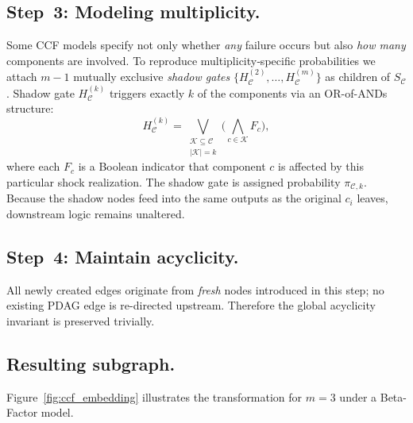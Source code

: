 \subsection{Step~3: Modeling multiplicity.}  Some CCF models specify not only
whether \emph{any} failure occurs but also \emph{how many} components are
involved.  To reproduce multiplicity‐specific probabilities we attach
\(m-1\) mutually exclusive \textit{shadow gates}
\(\{ H^{(2)}_{\mathcal{C}},\dots,H^{(m)}_{\mathcal{C}} \}\) as children of
\(S_{\mathcal{C}}\).  Shadow gate \(H^{(k)}_{\mathcal{C}}\) triggers exactly
\(k\) of the components via an OR-of-ANDs structure:
\[H^{(k)}_{\mathcal{C}}= \bigvee_{\substack{\mathcal{K}\subseteq\mathcal{C}\\|
\mathcal{K}|=k}}
           \bigl(\bigwedge_{c\in\mathcal{K}} F_c\bigr),
\]
where each \(F_c\) is a Boolean indicator that component \(c\) is affected by
this particular shock realization.  The shadow gate is assigned probability
\(\pi_{\mathcal{C},k}\).  Because the shadow nodes feed into the same outputs
as the original \(c_i\) leaves, downstream logic remains unaltered.

\subsection{Step~4: Maintain acyclicity.}  All newly created edges originate
from \emph{fresh} nodes introduced in this step; no existing PDAG edge is
re-directed upstream.  Therefore the global acyclicity invariant is preserved
trivially.

\subsection{Resulting subgraph.}  Figure~\ref{fig:ccf_embedding} illustrates
the transformation for \(m=3\) under a Beta-Factor model.

